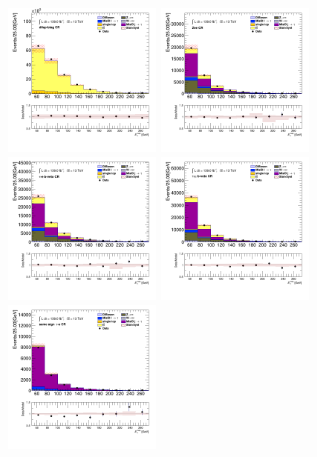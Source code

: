 		\begin{figure}[!htp]
			\begin{center}    
			\includegraphics[width=0.35\textwidth]{chapters/chapter6_HPlus/images/taulep/met_et_DILEP_BTAG.png}
			\includegraphics[width=0.35\textwidth]{chapters/chapter6_HPlus/images/taulep/met_et_ZEE.png} \\
			\includegraphics[width=0.35\textwidth]{chapters/chapter6_HPlus/images/taulep/met_et_TAUEL_BVETO.png} 
			\includegraphics[width=0.35\textwidth]{chapters/chapter6_HPlus/images/taulep/met_et_TAUMU_BVETO.png} \\
			\includegraphics[width=0.35\textwidth]{chapters/chapter6_HPlus/images/taulep/met_et_SS_TAUEL.png} 

\end{center}
\end{figure}
